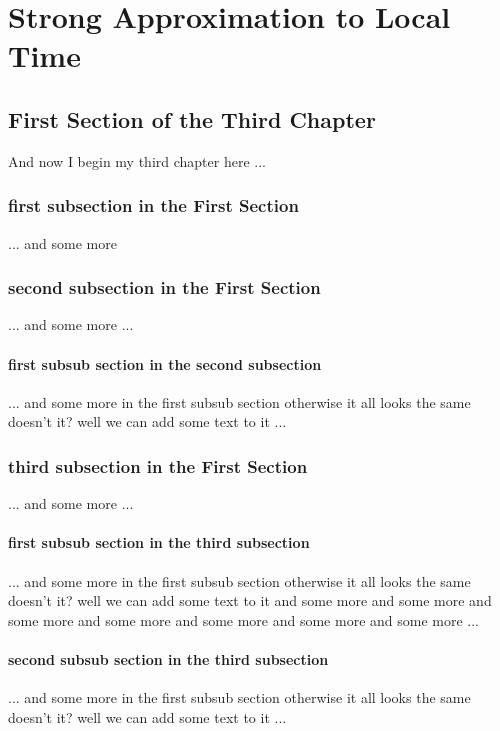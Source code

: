 \chapter{Strong Approximation to Local Time}
\ifpdf
    \graphicspath{{Chapter3/Chapter3Figs/PNG/}{Chapter3/Chapter3Figs/PDF/}{Chapter3/Chapter3Figs/}}
\else
    \graphicspath{{Chapter3/Chapter3Figs/EPS/}{Chapter3/Chapter3Figs/}}
\fi

\section{First Section of the Third Chapter}
And now I begin my third chapter here ...

\subsection{first subsection in the First Section}
... and some more 

\subsection{second subsection in the First Section}
... and some more ...

\subsubsection{first subsub section in the second subsection}
... and some more in the first subsub section otherwise it all looks the same
doesn't it? well we can add some text to it ...

\subsection{third subsection in the First Section}
... and some more ...

\subsubsection{first subsub section in the third subsection}
... and some more in the first subsub section otherwise it all looks the same
doesn't it? well we can add some text to it and some more and some more and
some more and some more and some more and some more and some more ...

\subsubsection{second subsub section in the third subsection}
... and some more in the first subsub section otherwise it all looks the same
doesn't it? well we can add some text to it ...

